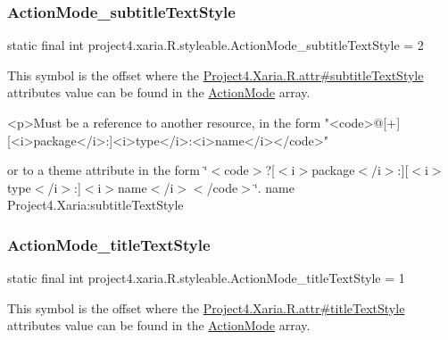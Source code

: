 \subsubsection{\texorpdfstring{Action\+Mode\+\_\+subtitle\+Text\+Style}{ActionMode\_subtitleTextStyle}}
{\footnotesize\ttfamily static final int project4.\+xaria.\+R.\+styleable.\+Action\+Mode\+\_\+subtitle\+Text\+Style = 2\hspace{0.3cm}{\ttfamily [static]}}

This symbol is the offset where the \hyperlink{}{Project4.\+Xaria.\+R.\+attr\#subtitle\+Text\+Style} attribute\textquotesingle{}s value can be found in the \hyperlink{classproject4_1_1xaria_1_1R_1_1styleable_af9c7aa13148c68a1e3b75f513d014daa}{Action\+Mode} array.

\begin{DoxyVerb}      <p>Must be a reference to another resource, in the form "<code>@[+][<i>package</i>:]<i>type</i>:<i>name</i></code>"
\end{DoxyVerb}
 or to a theme attribute in the form \char`\"{}$<$code$>$?\mbox{[}$<$i$>$package$<$/i$>$\+:\mbox{]}\mbox{[}$<$i$>$type$<$/i$>$\+:\mbox{]}$<$i$>$name$<$/i$>$$<$/code$>$\char`\"{}.  name Project4.\+Xaria\+:subtitle\+Text\+Style \mbox{\label{classproject4_1_1xaria_1_1R_1_1styleable_ac6453b7ab2d44d00d3056c12483f92cb}} 
\subsubsection{\texorpdfstring{Action\+Mode\+\_\+title\+Text\+Style}{ActionMode\_titleTextStyle}}
{\footnotesize\ttfamily static final int project4.\+xaria.\+R.\+styleable.\+Action\+Mode\+\_\+title\+Text\+Style = 1\hspace{0.3cm}{\ttfamily [static]}}

This symbol is the offset where the \hyperlink{}{Project4.\+Xaria.\+R.\+attr\#title\+Text\+Style} attribute\textquotesingle{}s value can be found in the \hyperlink{classproject4_1_1xaria_1_1R_1_1styleable_af9c7aa13148c68a1e3b75f513d014daa}{Action\+Mode} array.

